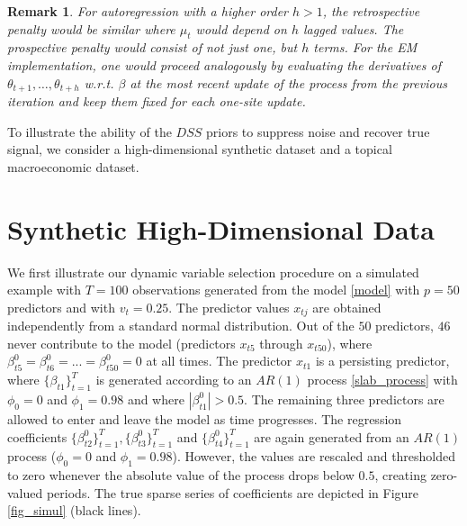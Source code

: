 \documentclass[ba]{imsart}
\numberwithin{equation}{section}
\theoremstyle{plain}
\newtheorem{remark}{Remark}
\begin{document}


\begin{remark}
For autoregression with a higher order $h>1$, the retrospective penalty would be similar where $\mu_t$ would depend on $h$ lagged values. The prospective penalty would consist of  not just one, but $h$ terms. For the EM implementation, one would proceed analogously by evaluating the  derivatives of $\theta_{t+1},\dots,\theta_{t+h}$ w.r.t. $\beta$  at the most recent update of the process from the previous iteration and keep them fixed for each one-site update.  
\end{remark}


To illustrate  the ability of  the $DSS$ priors to suppress noise and recover true signal, we consider a high-dimensional synthetic dataset and a topical macroeconomic dataset. 

\section{Synthetic High-Dimensional Data}\label{sec:simul}
We first illustrate our dynamic variable selection procedure on a simulated example with $T=100$ observations generated from the model  \eqref{model} with $p=50$ predictors and with $v_t=0.25$. 
The predictor values $x_{tj}$ are  obtained independently from a standard normal distribution. Out of the 
 $50$ predictors, $46$ never contribute to the model  (predictors $x_{t5}$ through $x_{t50}$), where $\beta_{t5}^0=\beta_{t6}^0=...=\beta_{t50}^0=0$ at all times. The predictor $x_{t1}$ is a persisting predictor, where $\{\beta_{t1}\}_{t=1}^T$ is generated according to an $AR(1)$ process \eqref{slab_process}  with $\phi_0=0$ and $\phi_1=0.98$ and where $|\beta_{t1}^0|>0.5$. 
The remaining three predictors are allowed to enter and leave the model as time progresses. The regression coefficients  $\{\beta^0_{t2}\}_{t=1}^T,\{\beta^0_{t3}\}_{t=1}^T$ and $\{\beta^0_{t4}\}_{t=1}^T$ are again generated from an $AR(1)$ process ($\phi_0=0$ and $\phi_1=0.98$). However, the values are rescaled and thresholded to zero whenever the absolute value of the process drops below $0.5$, creating zero-valued periods. The true sparse series of coefficients are depicted in Figure \ref{fig_simul} (black lines).
\end{document}
